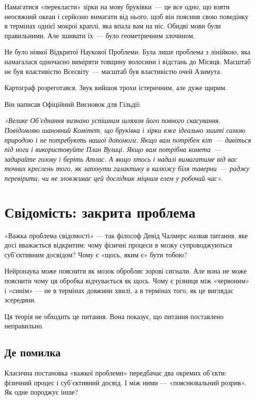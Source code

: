 \documentclass[12pt, a4paper, openany]{book}
\begin{document}
\begin{terrybox}
Намагатися «перекласти» зірки на мову бруківки~--- це все одно, що взяти неосяжний океан і серйозно вимагати від нього, щоб він пояснив свою поведінку в термінах однієї мокрої краплі, яка впала вам на ніс. Обидві мови були правильними. Але зшивати їх~--- було геометричним злочином.

Не було ніякої Відкритої Наукової Проблеми. Була лише проблема з лінійкою, яка намагалася одночасно виміряти товщину волосини і відстань до Місяця. Масштаб не був властивістю Всесвіту~--- масштаб був властивістю очей Азимута.

Картограф розреготався. Звук вийшов трохи істеричним, але дуже щирим.

Він написав Офіційний Висновок для Гільдії:

\medskip
\textit{«Велике Об'єднання визнано успішним шляхом його повного скасування. Повідомляю шановний Комітет, що бруківка і зірки вже ідеально зшиті самою природою і не потребують нашої допомоги. Якщо вам потрібен кіт~--- дивіться під ноги і використовуйте План Вулиці. Якщо вам потрібна комета~--- задирайте голову і беріть Атлас. А якщо хтось і надалі вимагатиме від вас точних креслень того, як запхнути галактику в калюжу біля таверни~--- раджу перевірити, чи не зловживає цей дослідник міцним елем у робочий час».}
\end{terrybox}

\chapter{Свідомість: закрита проблема}

«Важка проблема свідомості» --- так філософ Девід Чалмерс назвав питання, яке досі вважається відкритим: чому фізичні процеси в мозку супроводжуються суб'єктивним досвідом? Чому є «щось, яким є» бути тобою?

Нейронаука може пояснити як мозок обробляє зорові сигнали. Але вона не може пояснити чому ця обробка відчувається як щось. Чому є різниця між «червоним» і «синім» --- не в термінах довжини хвилі, а в термінах того, як це виглядає зсередини.

Ця теорія не обходить це питання. Вона показує, що питання поставлено неправильно.

\section{Де помилка}

Класична постановка «важкої проблеми» передбачає два окремих об'єкти: фізичний процес і суб'єктивний досвід. І між ними --- «пояснювальний розрив». Як одне породжує інше?
\end{document}
